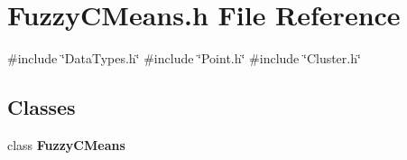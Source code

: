 \section{Fuzzy\+C\+Means.\+h File Reference}
\label{_fuzzy_c_means_8h}
{\ttfamily \#include \char`\"{}Data\+Types.\+h\char`\"{}}\newline
{\ttfamily \#include \char`\"{}Point.\+h\char`\"{}}\newline
{\ttfamily \#include \char`\"{}Cluster.\+h\char`\"{}}\newline
\subsection*{Classes}
\begin{DoxyCompactItemize}
\item 
class \textbf{ Fuzzy\+C\+Means}
\end{DoxyCompactItemize}
